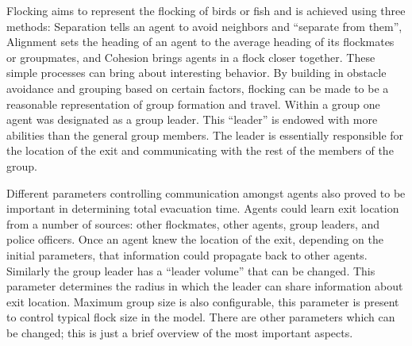 \documentclass{article}
\begin{document}
Flocking aims to represent the flocking of birds or fish and is
achieved using three methods: Separation tells an agent to avoid
neighbors and ``separate from them'', Alignment sets the heading of
an agent to the average heading of its flockmates or groupmates, and
Cohesion brings agents in a flock closer together. These simple
processes can bring about interesting behavior. By building in
obstacle avoidance and grouping based on certain factors, flocking can
be made to be a reasonable representation of group formation and
travel. Within a group one agent was designated as a group
leader. This ``leader'' is endowed with more abilities than the
general group members. The leader is essentially responsible for the
location of the exit and communicating with the rest of the members of
the group.

Different parameters controlling communication amongst agents also
proved to be important in determining total evacuation time. Agents
could learn exit location from a number of sources: other flockmates,
other agents, group leaders, and police officers. Once an agent knew
the location of the exit, depending on the initial parameters, that
information could propagate back to other agents. Similarly the group
leader has a ``leader volume'' that can be changed. This parameter
determines the radius in which the leader can share information about
exit location. Maximum group size is also configurable, this parameter
is present to control typical flock size in the model. There are other
parameters which can be changed; this is just a brief overview of the
most important aspects. 
\end{document}
